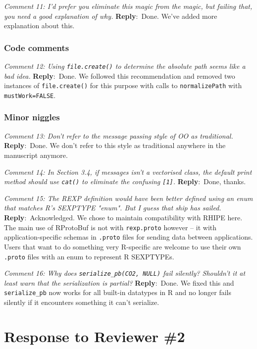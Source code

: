 \documentclass[10pt]{article}
\newcommand{\pointRaised}[2]{\smallskip %
  \textsl{{\fontseries{b}\selectfont #1}: #2}\newline}
\newcommand{\reply}[1]{\textbf{Reply}:\ #1 \smallskip } %
\begin{document}
\pointRaised{Comment 11}{
  I'd prefer you eliminate this magic from the magic, but failing that,
  you need a good explanation of why.}
\reply{Done. We've added more explanation about this.}

\subsubsection*{Code comments}

\pointRaised{Comment 12}{Using \texttt{file.create()} to determine the absolute path seems like a bad idea.}
\reply{Done. We followed this recommendation and removed two instances of
  \texttt{file.create()} for this purpose with calls to
  \texttt{normalizePath} with \texttt{mustWork=FALSE}.}

\subsubsection*{Minor niggles}

\pointRaised{Comment 13}{Don't refer to the message passing style of OO as traditional.}
\reply{Done. We don't refer to this style as traditional anywhere in
  the manuscript anymore.}

\pointRaised{Comment 14}{In Section 3.4, if messages isn't a vectorised class, the default
   print method should use \texttt{cat()} to eliminate the confusing \texttt{[1]}.}
\reply{Done, thanks.}

\pointRaised{Comment 15}{The REXP definition would have been better defined using an enum that
   matches R's SEXPTYPE "enum". But I guess that ship has sailed.}
\reply{Acknowledged.  We chose to maintain compatibility with RHIPE here.  The main
use of RProtoBuf is not with \texttt{rexp.proto} however -- it with
application-specific schemas in \texttt{.proto} files for sending data between
applications.  Users that want to do something very R-specific are
welcome to use their own \texttt{.proto} files with an enum to represent R SEXPTYPEs.}

\pointRaised{Comment 16}{Why does \texttt{serialize\_pb(CO2, NULL)} fail silently? Shouldn't it at least
   warn that the serialization is partial?}
\reply{Done. We fixed this and \texttt{serialize\_pb} now works for all built-in datatypes in R
  and no longer fails silently if it encounters something it can't serialize.}

\section*{Response to Reviewer \#2}
\end{document}
